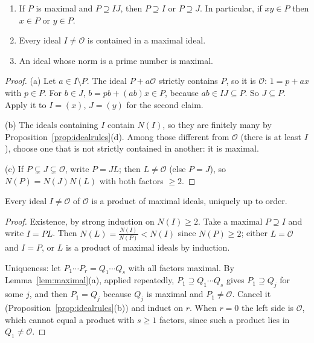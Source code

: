 \begin{lemma}\label{lem:maximal}
\begin{enumerate}[label=(\alph*)]
\item If $P$ is maximal and $P\supseteq IJ$, then $P\supseteq I$ or $P\supseteq J$. In particular, if $xy\in P$ then $x\in P$ or $y\in P$.
\item Every ideal $I\ne\mathcal O$ is contained in a maximal ideal.
\item An ideal whose norm is a prime number is maximal.
\end{enumerate}
\end{lemma}
\begin{proof}
(a) Let $a\in I\setminus P$. The ideal $P+a\mathcal O$ strictly contains $P$, so it is $\mathcal O$: $1=p+ax$ with $p\in P$. For $b\in J$, $b=pb+(ab)x\in P$, because $ab\in IJ\subseteq P$. So $J\subseteq P$. Apply it to $I=(x)$, $J=(y)$ for the second claim.

(b) The ideals containing $I$ contain $N(I)$, so they are finitely many by Proposition~\ref{prop:idealrules}(d). Among those different from $\mathcal O$ (there is at least $I$), choose one that is not strictly contained in another: it is maximal.

(c) If $P\subsetneq J\subsetneq\mathcal O$, write $P=JL$; then $L\ne\mathcal O$ (else $P=J$), so $N(P)=N(J)N(L)$ with both factors $\ge2$.
\end{proof}

\begin{theorem}[Dedekind]\label{thm:dedekind}
Every ideal $I\ne\mathcal O$ of $\mathcal O$ is a product of maximal ideals, uniquely up to order.
\end{theorem}
\begin{proof}
Existence, by strong induction on $N(I)\ge2$. Take a maximal $P\supseteq I$ and write $I=PL$. Then $N(L)=\frac{N(I)}{N(P)}<N(I)$ since $N(P)\ge2$; either $L=\mathcal O$ and $I=P$, or $L$ is a product of maximal ideals by induction.

Uniqueness: let $P_1\cdots P_r=Q_1\cdots Q_s$ with all factors maximal. By Lemma~\ref{lem:maximal}(a), applied repeatedly, $P_1\supseteq Q_1\cdots Q_s$ gives $P_1\supseteq Q_j$ for some $j$, and then $P_1=Q_j$ because $Q_j$ is maximal and $P_1\ne\mathcal O$. Cancel it (Proposition~\ref{prop:idealrules}(b)) and induct on $r$. When $r=0$ the left side is $\mathcal O$, which cannot equal a product with $s\ge1$ factors, since such a product lies in $Q_1\ne\mathcal O$.
\end{proof}

